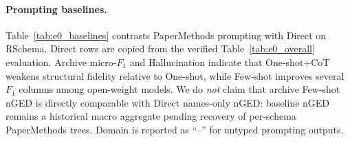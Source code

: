 \paragraph{Prompting baselines.}
Table~\ref{tab:e0_baselines} contrasts PaperMethods prompting with Direct on RSchema.
Direct rows are copied from the verified Table~\ref{tab:e0_overall} evaluation.
Archive micro-$F_1$ and Hallucination indicate that One-shot+CoT weakens structural
fidelity relative to One-shot, while Few-shot improves several $F_1$ columns among
open-weight models.
We do \emph{not} claim that archive Few-shot nGED is directly comparable with Direct
names-only nGED: baseline nGED remains a historical macro aggregate pending recovery
of per-schema PaperMethods trees.
Domain is reported as ``--'' for untyped prompting outputs.
